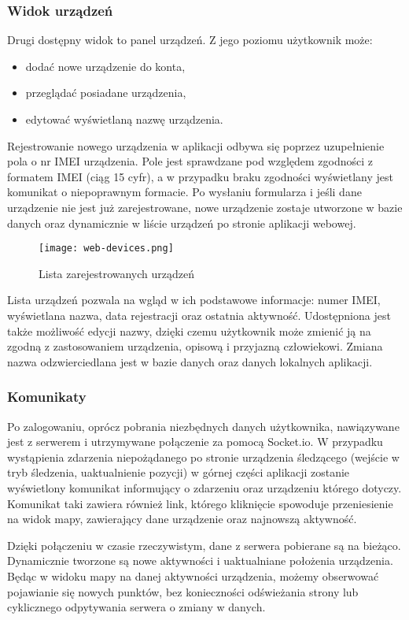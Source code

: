 \documentclass[eng,printmode]{mgr}
\begin{document}
\subsubsection{Widok urządzeń}
Drugi dostępny widok to panel urządzeń. Z jego poziomu użytkownik może:
\begin{itemize}
\item dodać nowe urządzenie do konta,
\item przeglądać posiadane urządzenia,
\item edytować wyświetlaną nazwę urządzenia.
\end{itemize}
Rejestrowanie nowego urządzenia w aplikacji odbywa się poprzez uzupełnienie pola o nr IMEI urządzenia. Pole jest sprawdzane pod względem zgodności z formatem IMEI (ciąg 15 cyfr), a w przypadku braku zgodności wyświetlany jest komunikat o niepoprawnym formacie. Po wysłaniu formularza i jeśli dane urządzenie nie jest już zarejestrowane, nowe urządzenie zostaje utworzone w bazie danych oraz dynamicznie w liście urządzeń po stronie aplikacji webowej.

\begin{figure}[ht]
\centering
\texttt{[image: web-devices.png]}
\caption{Lista zarejestrowanych urządzeń}
\end{figure}

Lista urządzeń pozwala na wgląd w ich podstawowe informacje: numer IMEI, wyświetlana nazwa, data rejestracji oraz ostatnia aktywność. Udostępniona jest także możliwość edycji nazwy, dzięki czemu użytkownik może zmienić ją na zgodną z zastosowaniem urządzenia, opisową i przyjazną człowiekowi. Zmiana nazwa odzwierciedlana jest w bazie danych oraz danych lokalnych aplikacji.

\subsubsection{Komunikaty}
Po zalogowaniu, oprócz pobrania niezbędnych danych użytkownika, nawiązywane jest z serwerem i utrzymywane połączenie za pomocą Socket.io. W przypadku wystąpienia zdarzenia niepożądanego po stronie urządzenia śledzącego (wejście w tryb śledzenia, uaktualnienie pozycji) w górnej części aplikacji zostanie wyświetlony komunikat informujący o zdarzeniu oraz urządzeniu którego dotyczy. Komunikat taki zawiera również link, którego kliknięcie spowoduje przeniesienie na widok mapy, zawierający dane urządzenie oraz najnowszą aktywność.

Dzięki połączeniu w czasie rzeczywistym, dane z serwera pobierane są na bieżąco. Dynamicznie tworzone są nowe aktywności i uaktualniane położenia urządzenia. Będąc w widoku mapy na danej aktywności urządzenia, możemy obserwować pojawianie się nowych punktów, bez konieczności odświeżania strony lub cyklicznego odpytywania serwera o zmiany w danych.
\end{document}
